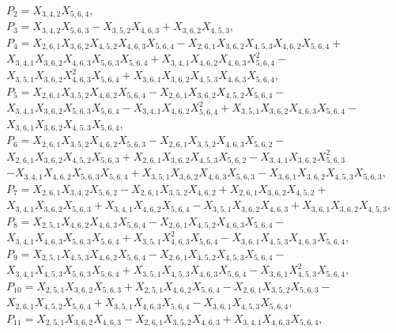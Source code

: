 \documentclass[10pt]{beamer}
\begin{document}
{$P_{2}=X_{3,4,2}X_{5,6,4},$\\
$P_{3}=X_{3,4,2}X_{5,6,3}-X_{3,5,2}X_{4,6,3}+X_{3,6,2}X_{4,5,3},$\\
$P_{4}=X_{2,6,1}X_{3,6,2}X_{4,5,2}X_{4,6,3}X_{5,6,4}-X_{2,6,1}X_{3,6,2}X_{4,5,3}X_{4,6,2}X_{5,6,4}+$\\
$X_{3,4,1}X_{3,6,2}X_{4,6,3}X_{5,6,3}X_{5,6,4}+X_{3,4,1}X_{4,6,2}X_{4,6,3}X_{5,6,4}^2-$\\
$X_{3,5,1}X_{3,6,2}X_{4,6,3}^2X_{5,6,4}+X_{3,6,1}X_{3,6,2}X_{4,5,3}X_{4,6,3}X_{5,6,4},$\\
$P_{5}=X_{2,6,1}X_{3,5,2}X_{4,6,2}X_{5,6,4}-X_{2,6,1}X_{3,6,2}X_{4,5,2}X_{5,6,4}-$\\
$X_{3,4,1}X_{3,6,2}X_{5,6,3}X_{5,6,4}-X_{3,4,1}X_{4,6,2}X_{5,6,4}^2+X_{3,5,1}X_{3,6,2}X_{4,6,3}X_{5,6,4}-$\\
$X_{3,6,1}X_{3,6,2}X_{4,5,3}X_{5,6,4},$\\
$P_{6}=X_{2,6,1}X_{3,5,2}X_{4,6,2}X_{5,6,3}-X_{2,6,1}X_{3,5,2}X_{4,6,3}X_{5,6,2}-$\\
$X_{2,6,1}X_{3,6,2}X_{4,5,2}X_{5,6,3}+X_{2,6,1}X_{3,6,2}X_{4,5,3}X_{5,6,2}-X_{3,4,1}X_{3,6,2}X_{5,6,3}^2$\\
$-X_{3,4,1}X_{4,6,2}X_{5,6,3}X_{5,6,4}+X_{3,5,1}X_{3,6,2}X_{4,6,3}X_{5,6,3}-X_{3,6,1}X_{3,6,2}X_{4,5,3}X_{5,6,3},$\\
$P_{7}=X_{2,6,1}X_{3,4,2}X_{5,6,2}-X_{2,6,1}X_{3,5,2}X_{4,6,2}+X_{2,6,1}X_{3,6,2}X_{4,5,2}+$\\
$X_{3,4,1}X_{3,6,2}X_{5,6,3}+X_{3,4,1}X_{4,6,2}X_{5,6,4}-X_{3,5,1}X_{3,6,2}X_{4,6,3}+X_{3,6,1}X_{3,6,2}X_{4,5,3},$\\
$P_{8}=X_{2,5,1}X_{4,6,2}X_{4,6,3}X_{5,6,4}-X_{2,6,1}X_{4,5,2}X_{4,6,3}X_{5,6,4}-$\\
$X_{3,4,1}X_{4,6,3}X_{5,6,3}X_{5,6,4}+X_{3,5,1}X_{4,6,3}^2X_{5,6,4}-X_{3,6,1}X_{4,5,3}X_{4,6,3}X_{5,6,4},$\\
$P_{9}=X_{2,5,1}X_{4,5,3}X_{4,6,2}X_{5,6,4}-X_{2,6,1}X_{4,5,2}X_{4,5,3}X_{5,6,4}-$\\
$X_{3,4,1}X_{4,5,3}X_{5,6,3}X_{5,6,4}+X_{3,5,1}X_{4,5,3}X_{4,6,3}X_{5,6,4}-X_{3,6,1}X_{4,5,3}^2X_{5,6,4},$\\
$P_{10}=X_{2,5,1}X_{3,6,2}X_{5,6,3}+X_{2,5,1}X_{4,6,2}X_{5,6,4}-X_{2,6,1}X_{3,5,2}X_{5,6,3}-$\\
$X_{2,6,1}X_{4,5,2}X_{5,6,4}+X_{3,5,1}X_{4,6,3}X_{5,6,4}-X_{3,6,1}X_{4,5,3}X_{5,6,4},$\\
$P_{11}=X_{2,5,1}X_{3,6,2}X_{4,6,3}-X_{2,6,1}X_{3,5,2}X_{4,6,3}+X_{3,4,1}X_{4,6,3}X_{5,6,4},$\\
}
\end{document}
